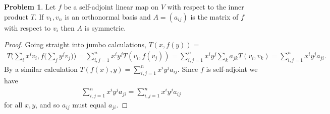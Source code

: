 \documentclass[20pt]{article}
\theoremstyle{plain}
\theoremstyle{definition}
\newtheorem*{problem}{Problem}
\begin{document}
\begin{problem}{4.11}
  Let $f$ be a self-adjoint linear map on $V$ with respect to the inner product
  $T$.  If $v_1, v_n$ is an orthonormal basis and $A = (a_{ij})$ is the matrix of 
  $f$ with respect to $v_i$ then $A$ is symmetric.
\end{problem}
\begin{proof}
  Going straight into jumbo calculations, $T(x, f(y)) = $
  \begin{align*}
    T \bigg( \sum_i x^iv_i, f \bigg( \sum_j y^jv_j  \bigg) \bigg) =
    \sum_{i,j = 1}^n x^iy^jT(v_i, f(v_j)) =
    \sum_{i,j = 1}^n x^iy^j \sum_k a_{jk} T(v_i, v_k) =
    \sum_{i,j = 1}^n x^iy^ja_{ji}.
  \end{align*}
  By a similar calculation $T(f(x), y) = \sum_{i,j = 1}^n x^iy^ja_{ij}$.
  Since $f$ is self-adjoint we have 
  \begin{align*}
    \sum_{i,j = 1}^n x^iy^ja_{ji} = \sum_{i,j = 1}^n x^iy^ja_{ij}
  \end{align*}
  for all $x, y$, and so $a_{ij}$ must equal $a_{ji}.$
\end{proof}
\end{document}
